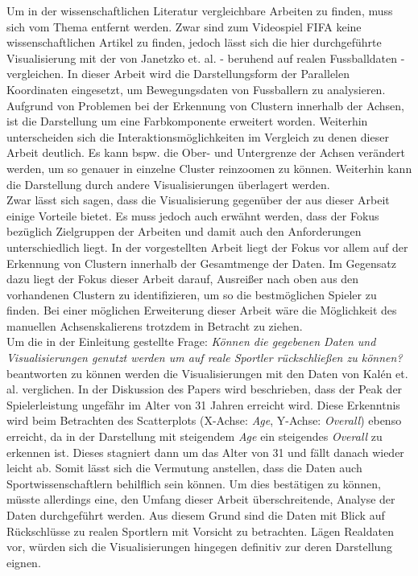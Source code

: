 \documentclass[usegeometry=true]{scrartcl}
\begin{document}
Um in der wissenschaftlichen Literatur vergleichbare Arbeiten zu finden, muss sich vom Thema entfernt werden. Zwar sind zum Videospiel FIFA keine wissenschaftlichen Artikel zu finden, jedoch lässt sich die hier durchgeführte Visualisierung mit der von Janetzko et. al.\cite{janetzko_enhancing_2016} - beruhend auf realen Fussballdaten - vergleichen.
In dieser Arbeit wird die Darstellungsform der Parallelen Koordinaten eingesetzt, um Bewegungsdaten von Fussballern zu analysieren. Aufgrund von Problemen bei der Erkennung von Clustern innerhalb der Achsen, ist die Darstellung um eine Farbkomponente erweitert worden. Weiterhin unterscheiden sich die Interaktionsmöglichkeiten im Vergleich zu denen dieser Arbeit deutlich. Es kann bspw. die Ober- und Untergrenze der Achsen verändert werden, um so genauer in einzelne Cluster reinzoomen zu können. Weiterhin kann die Darstellung durch andere Visualisierungen überlagert werden.\\
Zwar lässt sich sagen, dass die Visualisierung gegenüber der aus dieser Arbeit einige Vorteile bietet. Es muss jedoch auch erwähnt werden, dass der Fokus bezüglich Zielgruppen der Arbeiten und damit auch den Anforderungen unterschiedlich liegt. In der vorgestellten Arbeit liegt der Fokus vor allem auf der Erkennung von Clustern innerhalb der Gesamtmenge der Daten. Im Gegensatz dazu liegt der Fokus dieser Arbeit darauf, Ausreißer nach oben aus den vorhandenen Clustern zu identifizieren, um so die bestmöglichen Spieler zu finden.
Bei einer möglichen Erweiterung dieser Arbeit wäre die Möglichkeit des manuellen Achsenskalierens trotzdem in Betracht zu ziehen.\\

Um die in der Einleitung gestellte Frage: \textit{Können die gegebenen Daten und Visualisierungen genutzt werden um auf reale Sportler rückschließen zu können?} beantworten zu können werden die Visualisierungen mit den Daten von Kalén et. al.\cite{kalen_are_2019} verglichen. In der Diskussion des Papers wird beschrieben, dass der Peak der Spielerleistung ungefähr im Alter von 31 Jahren erreicht wird. Diese Erkenntnis wird beim Betrachten des Scatterplots (X-Achse: \textit{Age}, Y-Achse: \textit{Overall}) ebenso erreicht, da in der Darstellung mit steigendem \textit{Age} ein steigendes \textit{Overall} zu erkennen ist. Dieses stagniert dann um das Alter von 31 und fällt danach wieder leicht ab. Somit lässt sich die Vermutung anstellen, dass die Daten auch Sportwissenschaftlern behilflich sein können. Um dies bestätigen zu können, müsste allerdings eine, den Umfang dieser Arbeit überschreitende, Analyse der Daten durchgeführt werden. Aus diesem Grund sind die Daten mit Blick auf Rückschlüsse zu realen Sportlern mit Vorsicht zu betrachten. Lägen Realdaten vor, würden sich die Visualisierungen hingegen definitiv zur deren Darstellung eignen.    
\end{document}
